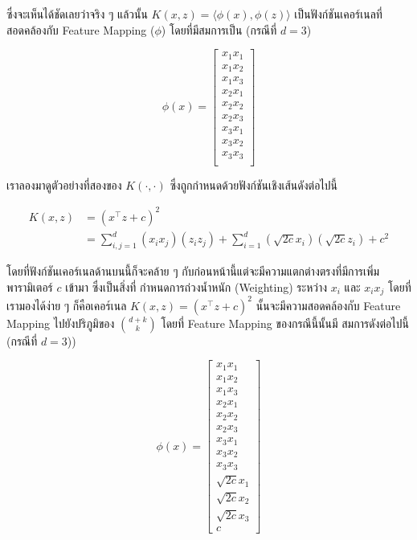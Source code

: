 \noindent ซึ่งจะเห็นได้ชัดเลยว่าจริง ๆ แล้วนั้น $K(x,z) = \langle\phi(x),\phi(z)\rangle$ เป็นฟังก์ชันเคอร์เนลที่สอดคล้องกับ Feature 
Mapping ($\phi$) โดยที่มีสมการเป็น (กรณีที่ $d = 3$)

\begin{equation}\label{eq:feature_map_ex1}
    \phi(x) = \begin{bmatrix}
    x_1 x_1\\
    x_1 x_2\\
    x_1 x_3\\
    x_2 x_1\\
    x_2 x_2\\
    x_2 x_3\\
    x_3 x_1\\
    x_3 x_2\\
    x_3 x_3\\
    \end{bmatrix}
\end{equation}

เราลองมาดูตัวอย่างที่สองของ $K(\cdot,\cdot)$ ซึ่งถูกกำหนดด้วยฟังก์ชันเชิงเส้นดังต่อไปนี้

\begin{align}
    K(x,z) &= (x^{\top} z + c)^2\\
    &= \sum_{i,j=1}^d (x_i x_j)(z_i z_j) + \sum_{i=1}^d \left(\sqrt{2c}x_i\right) \left(\sqrt{2c}z_i\right) 
    + c^2
\end{align}

\noindent โดยที่ฟังก์ชันเคอร์เนลด้านบนนี้ก็จะคล้าย ๆ กับก่อนหน้านี้แต่จะมีความแตกต่างตรงที่มีการเพิ่มพารามิเตอร์ $c$ เข้ามา ซึ่งเป็นสิ่งที่%
กำหนดการถ่วงน้ำหนัก (Weighting) ระหว่าง $x_{i}$ และ $x_{i}x_{j}$ โดยที่เรามองได้ง่าย ๆ ก็คือเคอร์เนล $K(x,z) = (x^{\top} 
z + c)^2$ นั้นจะมีความสอดคล้องกับ Feature Mapping ไปยังปริภูมิของ $\binom{d+k}{k}$ โดยที่ Feature Mapping ของกรณีนี้นั้นมี%
สมการดังต่อไปนี้ (กรณีที่ $d = 3$))

\begin{equation}\label{eq:feature_map_ex2}
    \phi(x) = \begin{bmatrix}
        x_1 x_1\\
        x_1 x_2\\
        x_1 x_3\\
        x_2 x_1\\
        x_2 x_2\\
        x_2 x_3\\
        x_3 x_1\\
        x_3 x_2\\
        x_3 x_3\\
        \sqrt{2c}x_1\\
        \sqrt{2c}x_2\\
        \sqrt{2c}x_3\\
        c
    \end{bmatrix}
\end{equation}

